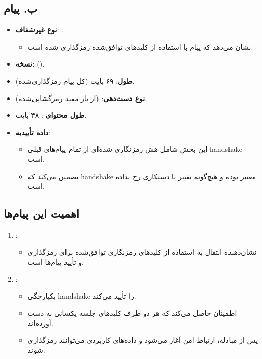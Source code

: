 \subsection*{ب. پیام }
\begin{itemize}
    \item \textbf{نوع غیرشفاف}: .
    \begin{itemize}
        \item نشان می‌دهد که پیام  با استفاده از کلیدهای توافق‌شده رمزگذاری شده است.
    \end{itemize}
    \item \textbf{نسخه}:  ().
    \item \textbf{طول}: ۶۹ بایت (کل پیام رمزگذاری‌شده).
    \item \textbf{نوع دست‌دهی}:  (از بار مفید رمزگشایی‌شده).
    \item \textbf{طول محتوای }: ۴۸ بایت.
    \item \textbf{داده تأییدیه}:
    \begin{itemize}
        \item این بخش شامل هش رمزنگاری شده‌ای از تمام پیام‌های قبلی handshake است.
        \item تضمین می‌کند که handshake معتبر بوده و هیچ‌گونه تغییر یا دستکاری رخ نداده است.
    \end{itemize}
\end{itemize}


\subsection*{اهمیت این پیام‌ها}
\begin{enumerate}
    \item \textbf{}:
    \begin{itemize}
        \item نشان‌دهنده انتقال به استفاده از کلیدهای رمزنگاری توافق‌شده برای رمزگذاری و تأیید پیام‌ها است.
    \end{itemize}
    \item \textbf{}:
    \begin{itemize}
        \item یکپارچگی handshake را تأیید می‌کند.
        \item اطمینان حاصل می‌کند که هر دو طرف کلیدهای جلسه یکسانی به دست آورده‌اند.
        \item پس از مبادله، ارتباط امن آغاز می‌شود و داده‌های کاربردی می‌توانند رمزگذاری شوند.
    \end{itemize}
\end{enumerate}

